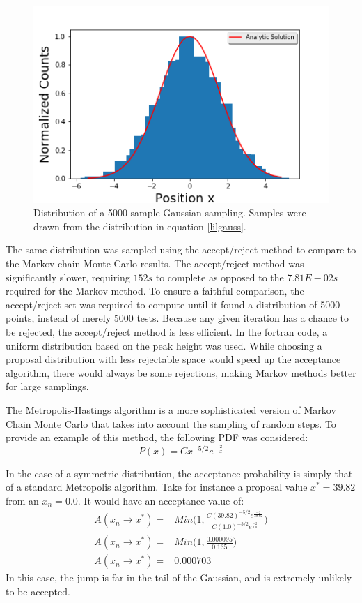 \documentclass[twocolumn]{article}
\begin{document}
\begin{figure}
\centering
\includegraphics[width=\linewidth]{MCMChisto}
\caption{Distribution of a 5000 sample Gaussian sampling. Samples were drawn from the distribution in equation \ref{lilgauss}.}
\label{fig:MCMChisto}
\end{figure}

The same distribution was sampled using the accept/reject method to compare to the Markov chain Monte Carlo results. The accept/reject method was significantly slower, requiring $152s$ to complete as opposed to the $7.81E-02s$ required for the Markov method. To ensure a faithful comparison, the accept/reject set was required to compute until it found a distribution of 5000 points, instead of merely 5000 tests. Because any given iteration has a chance to be rejected, the accept/reject method is less efficient. In the fortran code, a uniform distribution based on the peak height was used. While choosing a proposal distribution with less rejectable space would speed up the acceptance algorithm, there would always be some rejections, making Markov methods better for large samplings.

The Metropolis-Hastings algorithm is a more sophisticated version of Markov Chain Monte Carlo that takes into account the sampling of random steps. To provide an example of this method, the following PDF was considered:
\begin{equation}
P(x) = Cx^{-5/2}e^{-\frac{2}{x}}
\end{equation}

In the case of a symmetric distribution, the acceptance probability is simply that of a standard Metropolis algorithm. Take for instance a proposal value $x^* = 39.82$ from an $x_n=0.0$. It would have an acceptance value of:
\begin{equation}
\begin{split}
A(x_n \to x^*) =& Min \Bigg( 1, \frac{C(39.82)^{-5/2}e^{\frac{-2}{39.82}}}{C(1.0)^{-5/2}e^{\frac{-2}{1.0}}} \Bigg) \\
A(x_n \to x^*) =& Min \Bigg( 1, \frac{0.000095}{0.135} \Bigg) \\
A(x_n \to x^*) =& 0.000703
\end{split}
\end{equation}
In this case, the jump is far in the tail of the Gaussian, and is extremely unlikely to be accepted. 
\end{document}
